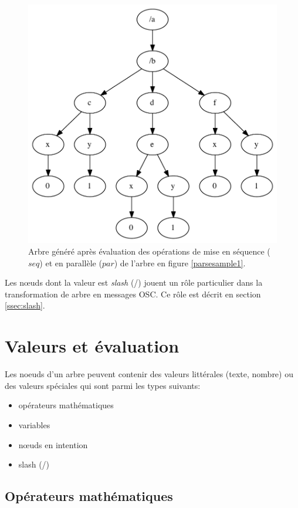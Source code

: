 \documentclass{article}
\begin{document}
\begin{figure}[htbp]
\begin{center}
\includegraphics[width=0.8\columnwidth]{eval/sample1}
\caption{Arbre généré après évaluation des opérations de mise en séquence ($seq$) et en parallèle ($par$) de l'arbre en figure \ref{parsesample1}.}
\label{treesample1}
\end{center}
\end{figure}

Les nœuds dont la valeur est \emph{slash} (/) jouent un rôle particulier dans la transformation de arbre en messages OSC. Ce rôle est décrit en section \ref{ssec:slash}.


\section{Valeurs et évaluation}\label{sec:valeurs}

Les noeuds d'un arbre peuvent contenir des valeurs littérales (texte, nombre) ou des valeurs spéciales qui sont parmi les types suivants:
\begin{itemize}
\item opérateurs mathématiques
\item variables
\item nœuds en intention
\item slash (/)
\end{itemize}


\subsection{Opérateurs mathématiques}
\end{document}
